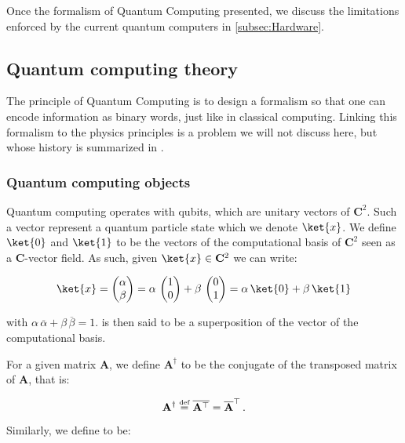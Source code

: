 \documentclass[11pt, a4paper]{article}
\begin{document}
        Once the formalism of Quantum Computing presented, we discuss the limitations enforced by the current quantum computers in \autoref{subsec:Hardware}.
        \subsection{Quantum computing theory}
            \label{subsec:QCT}
            The principle of Quantum Computing is to design a formalism so that one can encode information as binary words, just like in classical computing. Linking this formalism to the physics principles is a problem we will not discuss here, but whose history is summarized in \cite{HistoryEquivalence}.
            \subsubsection{Quantum computing objects}
                Quantum computing operates with qubits, which are unitary vectors of \(\mathbf{C}^2\). Such a vector represent a quantum particle state which we denote \(\ket{x}\). We define \(\ket{0}\) and \(\ket{1}\) to be the vectors of the computational basis of \(\mathbf{C}^2\) seen as a \(\mathbf{C}\)-vector field. As such, given \(\ket{x}\in\mathbf{C}^2\) we can write:
                
                \[\ket{x} = \begin{pmatrix}\alpha\\\beta\end{pmatrix}=\alpha\,\begin{pmatrix}1\\0\end{pmatrix} + \beta\,\begin{pmatrix}0\\1\end{pmatrix}=\alpha\,\ket{0} + \beta\,\ket{1}\]
                
                with \(\alpha\,\overline{\alpha} + \beta\,\overline{\beta} = 1\).  is then said to be a superposition of the vector of the computational basis.
                
                For a given matrix \(\mathbf{A}\), we define \(\mathbf{A}^\dagger\) to be the conjugate of the transposed matrix of \(\mathbf{A}\), that is:
                
                \[\mathbf{A}^\dagger \overset{\text{\tiny{def}}}{=} \overline{\mathbf{A}^\top} = \overline{\mathbf{A}}^\top\,.\]
                
                Similarly, we define  to be:
                
\end{document}
